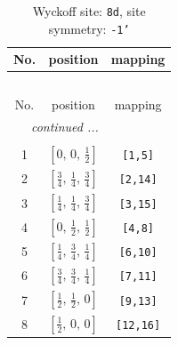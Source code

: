 \documentclass[fleqn,8pt]{jsarticle}
\begin{document}
\begin{longtable}{ccc}
\caption{Wyckoff site: {\tt 8d}, site symmetry: {\tt -1'}}
 \\
 \hline \hline
No. & position & mapping \\ \hline \endfirsthead

\multicolumn{2}{l}{\tablename\ \thetable{}} \\
 \hline \hline
No. & position & mapping \\ \hline \endhead

 \hline \hline
\multicolumn{2}{r}{\footnotesize\it continued ...} \\ \endfoot

 \hline \hline
\multicolumn{2}{r}{} \\ \endlastfoot

1 & $\left[ 0,\, 0,\, \frac{1}{2} \right]$ & {\tt [1,5]} \\ \hline
2 & $\left[ \frac{3}{4},\, \frac{1}{4},\, \frac{3}{4} \right]$ & {\tt [2,14]} \\ \hline
3 & $\left[ \frac{1}{4},\, \frac{1}{4},\, \frac{3}{4} \right]$ & {\tt [3,15]} \\ \hline
4 & $\left[ 0,\, \frac{1}{2},\, \frac{1}{2} \right]$ & {\tt [4,8]} \\ \hline
5 & $\left[ \frac{1}{4},\, \frac{3}{4},\, \frac{1}{4} \right]$ & {\tt [6,10]} \\ \hline
6 & $\left[ \frac{3}{4},\, \frac{3}{4},\, \frac{1}{4} \right]$ & {\tt [7,11]} \\ \hline
7 & $\left[ \frac{1}{2},\, \frac{1}{2},\, 0 \right]$ & {\tt [9,13]} \\ \hline
8 & $\left[ \frac{1}{2},\, 0,\, 0 \right]$ & {\tt [12,16]} \\
\end{longtable}
\renewcommand{\arraystretch}{1.2}
\end{document}
